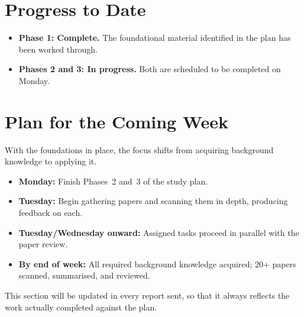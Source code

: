 \documentclass[11pt,a4paper]{article}
\begin{document}
\section{Progress to Date}

\begin{itemize}
  \item \textbf{Phase 1: Complete.} The foundational material identified in
        the plan has been worked through.
  \item \textbf{Phases 2 and 3: In progress.} Both are scheduled to be
        completed on Monday.
\end{itemize}

\section{Plan for the Coming Week}

With the foundations in place, the focus shifts from acquiring background
knowledge to applying it.

\begin{itemize}
  \item \textbf{Monday:} Finish Phases~2 and~3 of the study plan.
  \item \textbf{Tuesday:} Begin gathering papers and scanning them in depth,
        producing feedback on each.
  \item \textbf{Tuesday/Wednesday onward:} Assigned tasks proceed in parallel
        with the paper review.
  \item \textbf{By end of week:} All required background knowledge acquired;
        20+ papers scanned, summarised, and reviewed.
\end{itemize}

This section will be updated in every report sent, so that it always reflects
the work actually completed against the plan.
\end{document}
